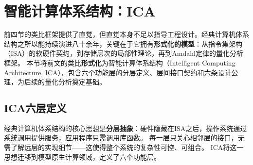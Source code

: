 \section{智能计算体系结构：ICA}
\label{sec:icam}

前四节的类比框架提供了直觉，但直觉本身不足以指导工程设计。经典计算机体系结构之所以能持续演进八十余年，关键在于它拥有\textbf{形式化的模型}：从指令集架构（ISA）的软硬件契约，到存储层次的局部性理论，再到Amdahl定律的量化分析框架。
本节将前文的类比\textbf{形式化}为智能计算体系结构（Intelligent Computing Architecture, ICA），包含六个功能层的分层定义、层间接口契约和六条设计公理，为后续的量化分析奠定基础。

\subsection{ICA六层定义}
\label{sec:icam-layers}

经典计算机体系结构的核心思想是\textbf{分层抽象}：硬件隐藏在ISA之后，操作系统通过系统调用提供服务，应用程序只需调用库函数。
每一层只关心相邻层的接口，无需了解远层的实现细节——这使得整个系统的复杂性可控、可组合。
ICA将这一思想迁移到模型原生计算领域，定义了六个功能层。

